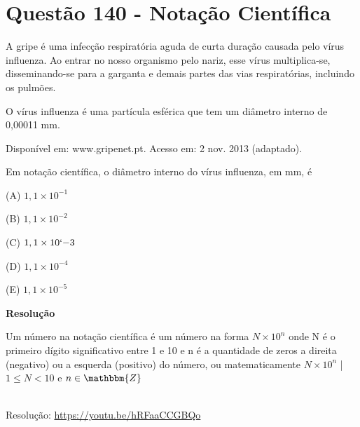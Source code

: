 \section{Questão 140 - Notação Científica}

A gripe é uma infecção respiratória aguda de curta duração causada pelo vírus influenza. Ao entrar no nosso organismo pelo nariz, esse vírus multiplica-se, disseminando-se para a garganta e demais partes das vias respiratórias, incluindo os pulmões. 

O vírus influenza é uma partícula esférica que tem um diâmetro interno de 0,00011 mm.

\begin{flushright}
    {\scriptsize Disponível em: www.gripenet.pt. Acesso em: 2 nov. 2013 (adaptado).}
\end{flushright}

Em notação científica, o diâmetro interno do vírus influenza, em mm, é

(A)  $ 1,1 \times 10^{-1} $

(B)  $ 1,1 \times 10^{-2} $

(C)  $ 1,1 \times 10`{-3} $

(D)  $ 1,1 \times 10^{-4} $

(E)  $ 1,1 \times 10^{-5} $

\textbf{Resolução}

Um número na notação científica é um número na forma $ N \times 10^{n} $ onde N é o primeiro dígito significativo entre 1 e 10 e n é a quantidade de zeros a direita (negativo) ou a esquerda (positivo) do número, ou matematicamente $ N \times 10^{n} $ | $1 \leqslant N < 10 $ e $n \in \mathbbm{Z} $


\noindent {}


\begin{center}
    \href{https://youtu.be/hRFaaCCGBQo}{
    }\\
    {\scriptsize Resolução: \url{https://youtu.be/hRFaaCCGBQo}}
\end{center}